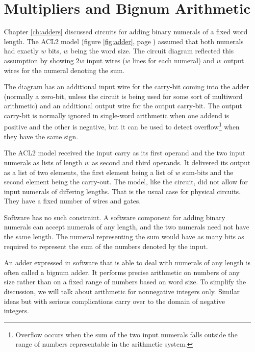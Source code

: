 \chapter{Multipliers and Bignum Arithmetic}
\label{ch:multipliers}


Chapter \ref{ch:adders} discussed circuits for adding binary numerals of a
fixed word length.
The ACL2 model (figure \ref{fig:adder}, page \pageref{fig:adder})
assumed that both numerals had exactly $w$ bits, $w$ being the word size.
The circuit diagram reflected this assumption by
showing $2w$ input wires ($w$ lines for each numeral) and
$w$ output wires for the numeral denoting the sum.

The diagram has an additional input wire for the carry-bit
coming into the adder (normally a zero-bit, unless the circuit is being
used for some sort of multiword arithmetic) and an additional output wire
for the output carry-bit.
The output carry-bit is normally ignored in single-word arithmetic
when one addend is positive and the other is negative,
but it can be used to detect overflow\footnote{Overflow occurs
when the sum of the two input numerals falls outside
the range of numbers representable in the arithmetic system.}
when they have the same sign.

The ACL2 model received the input carry as its first operand
and the two input numerals as lists of length $w$ as second and third operands.
It delivered its output as a list of two elements,
the first element being a list of $w$ sum-bits
and the second element being the carry-out.
The model, like the circuit, did not allow for input numerals
of differing lengths.
That is the usual case for physical circuits.
They have a fixed number of wires and gates.

Software has no such constraint.
A software component for adding binary numerals can accept
numerals of any length, and the two numerals need not have the same length.
The numeral representing the sum would have as many bits as
required to represent the sum of the numbers
denoted by the input.

An adder expressed in software that is able to deal with numerals
of
any length is often called a bignum adder.
It performs precise arithmetic on numbers of any size
rather than on a fixed range of numbers based on word size.
To simplify the discussion, we will talk about arithmetic
for nonnegative integers only. Similar ideas but
with serious complications carry over
to the domain of negative integers.

